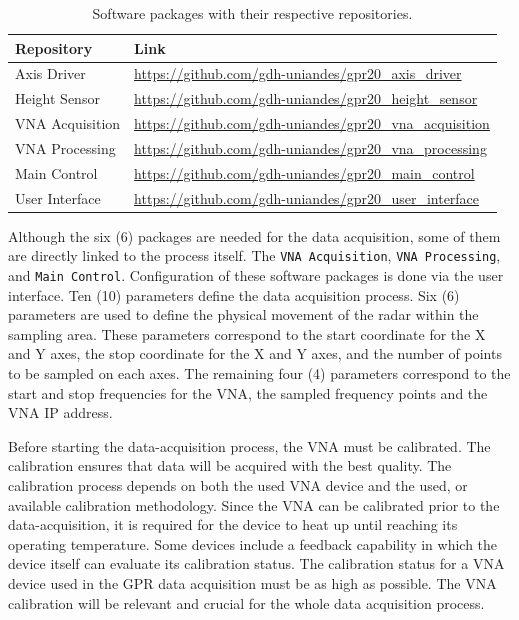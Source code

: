 \documentclass{article}
\begin{document}
\begin{singlespace}
    \begin{xltabular}{\textwidth}{|l|X|}
    
        \hline \textbf{Repository} & \textbf{Link} \\ \hline
        \endhead
        
        \caption{Software packages with their respective repositories.} \label{tab:software_repos}
        \endlastfoot
        
        Axis Driver & \url{https://github.com/gdh-uniandes/gpr20_axis_driver} \\ \hline
        Height Sensor & \url{https://github.com/gdh-uniandes/gpr20_height_sensor} \\ \hline
        VNA Acquisition & \url{https://github.com/gdh-uniandes/gpr20_vna_acquisition} \\ \hline
        VNA Processing & \url{https://github.com/gdh-uniandes/gpr20_vna_processing} \\ \hline
        Main Control & \url{https://github.com/gdh-uniandes/gpr20_main_control} \\ \hline
        User Interface & \url{https://github.com/gdh-uniandes/gpr20_user_interface} \\ \hline
    \end{xltabular}
\end{singlespace}

Although the six (6) packages are needed for the data acquisition, some of them are directly linked to the process itself. The \texttt{VNA Acquisition}, \texttt{VNA Processing}, and \texttt{Main Control}. Configuration of these software packages is done via the user interface. Ten (10) parameters define the data acquisition process. Six (6) parameters are used to define the physical movement of the radar within the sampling area. These parameters correspond to the start coordinate for the X and Y axes, the stop coordinate for the X and Y axes, and the number of points to be sampled on each axes. The remaining four (4) parameters correspond to the start and stop frequencies for the VNA, the sampled frequency points and the VNA IP address.

Before starting the data-acquisition process, the VNA must be calibrated. The calibration ensures that data will be acquired with the best quality. The calibration process depends on both the used VNA device and the used, or available calibration methodology. Since the VNA can be calibrated prior to the data-acquisition, it is required for the device to heat up until reaching its operating temperature. Some devices include a feedback capability in which the device itself can evaluate its calibration status. The calibration status for a VNA device used in the GPR data acquisition must be as high as possible. The VNA calibration will be relevant and crucial for the whole data acquisition process. 
\end{document}
